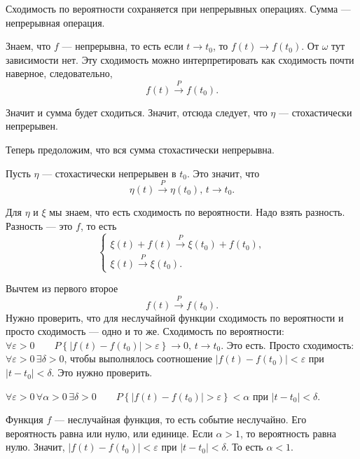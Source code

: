 Сходимость по вероятности сохраняется при непрерывных операциях.
Сумма --- непрерывная операция.

Знаем, что $f$ --- непрерывна, то есть если $t \to t_0$,
то $f \left( t \right) \to f \left( t_0 \right) $.
От $ \omega $ тут зависимости нет.
Эту сходимость можно интерпретировать как сходимость почти наверное, следовательно,
$$f \left( t \right) \overset{P}{ \to }
  f \left( t_0 \right).$$

Значит и сумма будет сходиться.
Значит, отсюда следует, что $ \eta $ --- стохастически непрерывен.

Теперь предоложим, что вся сумма стохастически непрерывна.

Пусть $ \eta $ --- стохастически непрерывен в $t_0$.
Это значит, что
$$ \eta \left( t \right) \overset{P}{ \to } \eta \left( t_0 \right), \,
  t \to t_0.$$

Для $ \eta $ и $ \xi $ мы знаем, что есть сходимость по вероятности.
Надо взять разность.
Разность --- это $f$, то есть
$$ \begin{cases}
    \xi \left( t \right) + f \left( t \right) \overset{P}{ \to }
    \xi \left( t_0 \right) + f \left( t_0 \right), \\
    \xi \left( t \right) \overset{P}{ \to } \xi \left( t_0 \right).
  \end{cases}$$

Вычтем из первого второе
$$f \left( t \right) \overset{P}{ \to }
  f \left( t_0 \right).$$
Нужно проверить, что для неслучайной функции сходимость по вероятности и просто сходимость ---
одно и то же.
Сходимость по вероятности:
$ \forall \varepsilon > 0 \qquad
  P \left\{ \left| f \left( t \right) - f \left( t_0 \right) \right| > \varepsilon \right\} \to 0,
  \, t \to t_0$.
Это есть.
Просто сходимость: $ \forall \varepsilon > 0 \, \exists \delta > 0$,
чтобы выполнялось соотношение
$ \left| f \left( t \right) - f \left( t_0 \right) \right| <
  \varepsilon $
при $ \left| t - t_0 \right| < \delta $.
Это нужно проверить.

$ \forall \varepsilon > 0 \, \forall \alpha > 0 \, \exists \delta > 0 \qquad
  P \left\{ \left| f \left( t \right) - f \left( t_0 \right) \right| > \varepsilon \right\} <
  \alpha $
при $ \left| t - t_0 \right| < \delta $.

Функция $f$ --- неслучайная функция, то есть событие неслучайно.
Его вероятность равна или нулю, или единице.
Если $ \alpha > 1$, то вероятность равна нулю.
Значит, $ \left| f \left( t \right) - f \left( t_0 \right) \right| < \varepsilon $ при
$ \left| t - t_0 \right| <
  \delta $.
То есть $ \alpha < 1$.

